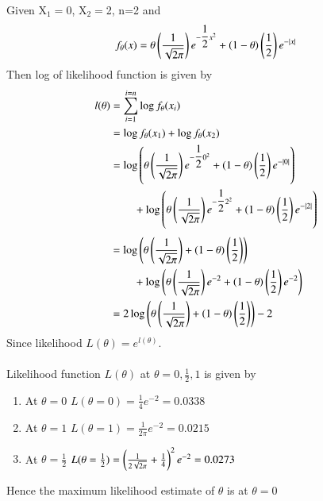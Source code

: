Given X$_{1}=$0, X$_{2}=$2, n=2 and
\begin{align}
    f_{\theta}(x) =\theta \left(\dfrac{1}{\sqrt{2\pi}}\right)e^{-\dfrac{1}{2} x^{2}} + \left(1-\theta\right)\left(\dfrac{1}{2}\right)e^{-\mid x\mid}
\end{align}
Then log of likelihood function is given by
\begin{align}
l(\theta) &= \sum_{i=1}^{i=n} \log f_{\theta}(x_{i})\\
&= \log f_{\theta}(x_{1}) + \log f_{\theta}(x_{2}) \\
&=\log\left(\theta\left(\dfrac{1}{\sqrt{2\pi}}\right)e^{-\dfrac{1}{2}0^{2}}+\left(1-\theta\right)\left(\dfrac{1}{2}\right)e^{-\mid 0\mid}\right) \nonumber\\&\hspace{0.75cm}+\log\left(\theta\left(\dfrac{1}{\sqrt{2\pi}}\right) e^{-\dfrac{1}{2}2^{2}}+\left(1-\theta\right)\left(\dfrac{1}{2}\right)e^{-\mid 2\mid}\right)
\end{align}
\begin{align}
&=\log\left(\theta\left(\dfrac{1}{\sqrt{2\pi}}\right)+(1-\theta)\left(\dfrac{1}{2}\right)\right)\nonumber\\&\hspace{0.75cm}+\log\left(\theta\left(\dfrac{1}{\sqrt{2\pi}}\right) e^{-2}+\left(1-\theta\right)\left(\dfrac{1}{2}\right)e^{-2}\right)\\
&=2\log\left(\theta\left(\dfrac{1}{\sqrt{2\pi}}\right)+\left(1-\theta\right)\left(\dfrac{1}{2}\right)\right) -2
\end{align}
Since likelihood $L(\theta) = e^{l(\theta)}$.\\ \\
Likelihood function $L(\theta)$  at $\theta = 0, \frac{1}{2}, 1$ is given by
\begin{enumerate}
    \item At $\theta=0$ \hspace{0.5cm} $L(\theta=0)=\frac{1}{4}e^{-2}=0.0338$\\
    \item At $\theta=1$ \hspace{0.5cm} $L(\theta=1)=\frac{1}{2\pi}e^{-2}=0.0215$\\
    \item At $\theta=\frac{1}{2}$ \hspace{0.2cm}
    $L(\theta=\frac{1}{2})=\left(\frac{1}{2\sqrt{2\pi}}+\frac{1}{4}\right)^{2}e^{-2}=0.0273$
\end{enumerate}
Hence the maximum likelihood estimate of $\theta$ is at $\theta=0$

